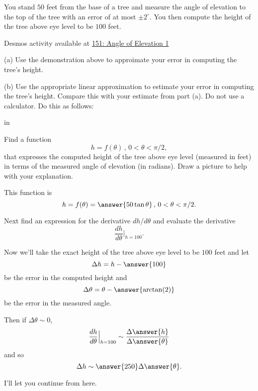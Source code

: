 \documentclass{ximera}
\newcommand{\pskip}{\vskip 0.1 in}
\begin{document}
\begin{question}  \label{Q:defr4gg4t}
You stand $50$ feet from the base of a tree and measure the angle of elevation to the top of the tree with an error of at most $\pm 2^\circ$. You then compute the height of the tree above eye level to be $100$ feet. 

\begin{onlineOnly}
    \begin{center}
\end{center}
\end{onlineOnly}

Desmos activity available at \href{https://www.desmos.com/calculator/yjyghsoeog}{151: Angle of Elevation 1}

(a) Use the demonstration above to approimate your error in computing the tree's height.  

(b) Use the appropriate linear approximation to estimate your error in computing the tree's height. Compare this with your estimate from part (a). Do not use a calculator. Do this as follows:

\pskip 

\begin{itemize}

\item{Find a function
\[
    h = f(\theta) \, , \, 0<\theta < \pi/2 ,
\]
that expresses the computed height of the tree above eye level (measured in feet) in terms of the measured angle of elevation (in radians). Draw a picture to help with your explanation.

This function is
\[
   h = f(\theta) = \answer{50\tan\theta} \, , \, 0<\theta < \pi/2 .
\]
}

\item{Next find an expression for the derivative $dh/d\theta$ and evaluate the derivative
\[
     \frac{dh}{d\theta}\Big|_{h=100} .
\]
}

\item{Now we'll take the exact height of the tree above eye level to be $100$ feet and let
\[
     \Delta h = h -  \answer{100}
\]
be the error in the computed height and 
\[
   \Delta \theta = \theta - \answer{\arctan(2)}
\]
be the error in the measured angle.

Then if $\Delta\theta \sim 0$, 
\[
      \frac{dh}{d\theta}\Big|_{h=100} \sim \frac{\Delta \answer{h}}{\Delta \answer {\theta}}
\]
and so
\[
     \Delta h \sim \answer{250} \Delta {\answer{\theta}} .
\]

\item{I'll let you continue from here.}
 }
\end{itemize}
\end{question}
\end{document}
